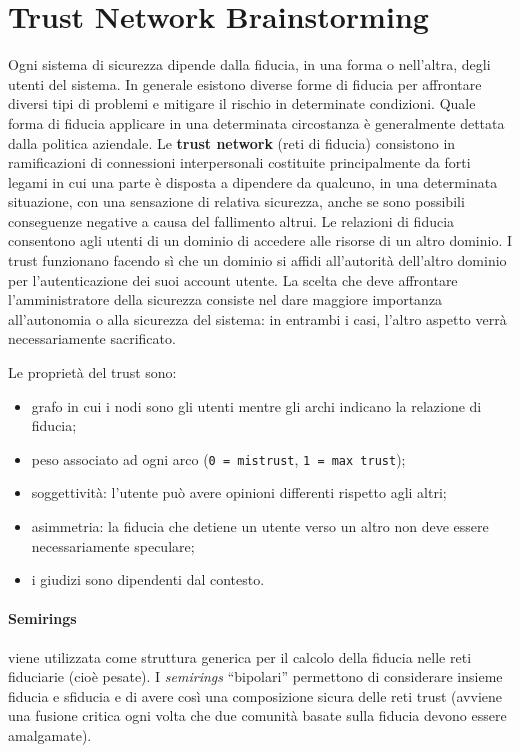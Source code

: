 \newpage

\section{Trust Network Brainstorming}

Ogni sistema di sicurezza dipende dalla fiducia, in una forma o nell'altra,
degli utenti del sistema. In
generale esistono diverse forme di fiducia per affrontare diversi tipi di problemi
e mitigare il rischio
in determinate condizioni. Quale forma di fiducia applicare in una determinata
circostanza è generalmente dettata dalla politica aziendale.
Le \textbf{trust network} (reti di fiducia) consistono in ramificazioni di connessioni interpersonali costituite principalmente da forti legami in cui una parte è disposta a dipendere da qualcuno, in una determinata situazione, con una sensazione di relativa sicurezza, anche se sono possibili conseguenze negative a causa del fallimento altrui.
Le relazioni di fiducia consentono agli utenti di un dominio di accedere alle
risorse di un altro dominio. I trust funzionano facendo sì che un dominio si
affidi all'autorità dell'altro dominio per
l'autenticazione dei suoi account utente.
La scelta che deve affrontare l'amministratore della sicurezza consiste nel
dare maggiore importanza all'autonomia o alla sicurezza del sistema:
in entrambi i casi, l'altro aspetto verrà necessariamente sacrificato.

Le proprietà del trust sono:

\begin{itemize}
    \item grafo in cui i nodi sono gli utenti mentre gli archi indicano la
          relazione di fiducia;
    \item peso associato ad ogni arco (\verb|0 = mistrust|, \verb|1 = max trust|);
    \item soggettività: l'utente può avere opinioni differenti rispetto agli altri;
    \item asimmetria: la fiducia che detiene un utente verso un altro non
          deve essere
          necessariamente speculare;
    \item i giudizi sono dipendenti dal contesto.
\end{itemize}

\paragraph{Semirings}
viene utilizzata come struttura generica per il calcolo della
fiducia nelle reti fiduciarie (cioè pesate). I \textit{semirings} ``bipolari''
permettono di considerare insieme fiducia e sfiducia e di avere
così una composizione sicura delle reti trust
(avviene una fusione critica ogni volta che due comunità basate sulla fiducia
devono essere amalgamate).